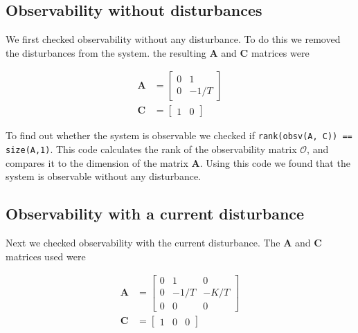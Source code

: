 \subsection{Observability without disturbances} \label{subsec:4b}

 We first checked observability without any disturbance. To do this we removed the disturbances from the system. the resulting $\mathbf{A}$ and $\mathbf{C}$ matrices were

\begin{subequations}
    \begin{align}
        \mathbf{A} &= \begin{bmatrix}
        0 & 1 \\
        0 & -1/T
        \end{bmatrix} \\
        \mathbf{C} &= \begin{bmatrix}
        1 & 0
        \end{bmatrix}
    \end{align}
\end{subequations}

To find out whether the system is observable we checked if \texttt{rank(obsv(A, C)) == size(A,1)}. This code calculates the rank of the observability matrix $\mathcal{O}$, and compares it to the dimension of the matrix $\mathbf{A}$. Using this code we found that the system is observable without any disturbance.

\subsection{Observability with a current disturbance}

Next we checked observability with the current disturbance. The $\mathbf{A}$ and $\mathbf{C}$ matrices used were

\begin{subequations}
    \begin{align}
        \mathbf{A} &= \begin{bmatrix}
        0 & 1 & 0 \\
        0 & -1/T & -K/T \\
        0 & 0 & 0
        \end{bmatrix} \\
        \mathbf{C} &= \begin{bmatrix}
        1 & 0 & 0
        \end{bmatrix}
    \end{align}
\end{subequations}

